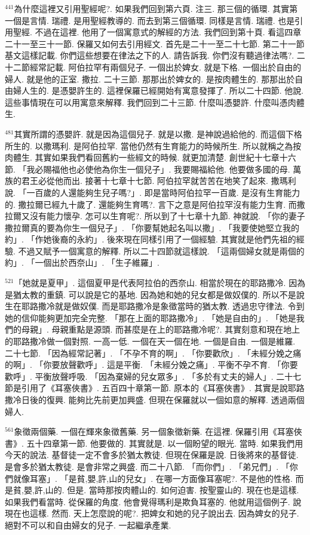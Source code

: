 \documentclass{book}
\begin{document}
$^{441}$為什麼這裡又引用聖經呢?.
如果我們回到第六頁.
注三.
那三個的循環.
其實第一個是言情.
瑞禮.
是用聖經教導的.
而去到第三個循環.
同樣是言情.
瑞禮.
也是引用聖經.
不過在這裡.
他用了一個寓意式的解經的方法.
我們回到第十頁.
看這四章二十一至三十一節.
保羅又如何去引用經文.
首先是二十一至二十七節.
第二十一節基文這樣記載.
你們這些想要在律法之下的人.
請告訴我.
你們沒有聽過律法嗎?.
二十二節經常記載.
阿伯拉罕有兩個兒子.
一個出於婢女.
就是下格.
一個出於自由的婦人.
就是他的正室.
撒拉.
二十三節.
那那出於婢女的.
是按肉體生的.
那那出於自由婦人生的.
是憑嬰許生的.
這裡保羅已經開始有寓意發揮了.
所以二十四節.
他說.
這些事情現在可以用寓意來解釋.
我們回到二十三節.
什麼叫憑嬰許.
什麼叫憑肉體生.

$^{481}$其實所謂的憑嬰許.
就是因為這個兒子.
就是以撒.
是神說過給他的.
而這個下格所生的.
以撒瑪利.
是阿伯拉罕.
當他仍然有生育能力的時候所生.
所以就稱之為按肉體生.
其實如果我們看回舊約一些經文的時候.
就更加清楚.
創世紀十七章十六節.
「我必賜福他也必使他為你生一個兒子」.
我要賜福給他.
他要做多國的母.
萬族的君王必從他而出.
接著十七章十七節.
阿伯拉罕就苦苦在地笑了起來.
撒瑪利說.
「一百歲的人還能夠生兒子嗎?」.
即是當時阿伯拉罕一百歲.
是沒有生育能力的.
撒拉爾已經九十歲了.
還能夠生育嗎?.
言下之意是阿伯拉罕沒有能力生育.
而撒拉爾又沒有能力懷孕.
怎可以生育呢?.
所以到了十七章十九節.
神就說.
「你的妻子撒拉爾真的要為你生一個兒子」.
「你要幫她起名叫以撒」.
「我要使她堅立我的約」.
「作她後裔的永約」.
後來現在同樣引用了一個經驗.
其實就是他們先祖的經驗.
不過又賦予一個寓意的解釋.
所以二十四節就這樣說.
「這兩個婦女就是兩個的約」.
「一個出於西奈山」.
「生子維羅」.

$^{521}$「她就是夏甲」.
這個夏甲是代表阿拉伯的西奈山.
相當於現在的耶路撒冷.
因為是猶太教的重鎮.
可以說是它的基地.
因為她和她的兒女都是做奴僕的.
所以不是說生在耶路撒冷就是做奴僕.
而是耶路撒冷是象徵當時的猶太教.
透過忠守律法.
令到她的信仰能夠更加完全完整.
「那在上面的耶路撒冷」.
「她是自由的」.
「她是我們的母親」.
母親重點是源頭.
而甚麼是在上的耶路撒冷呢?.
其實刻意和現在地上的耶路撒冷做一個對照.
一高一低.
一個在天一個在地.
一個是自由.
一個是維羅.
二十七節.
「因為經常記著」.
「不孕不育的啊」.
「你要歡欣」.
「未經分娩之痛的啊」.
「你要放聲歡呼」.
這是平衡.
「未經分娩之痛」.
平衡不孕不育.
「你要歡呼」.
平衡放聲呼吸.
「因為棄婦的兒女眾多」.
「多於有丈夫的婦人」.
二十七節是引用了《耳塞俠書》.
五百四十章第一節.
原本的《耳塞俠書》.
其實是說耶路撒冷日後的復興.
能夠比先前更加興盛.
但現在保羅就以一個如意的解釋.
透過兩個婦人.

$^{561}$象徵兩個藥.
一個在輝來象徵舊藥.
另一個象徵新藥.
在這裡.
保羅引用《耳塞俠書》.
五十四章第一節.
他要做的.
其實就是.
以一個盼望的眼光.
當時.
如果我們用今天的說法.
基督徒一定不會多於猶太教徒.
但現在保羅是說.
日後將來的基督徒.
是會多於猶太教徒.
是會非常之興盛.
而二十八節.
「而你們」.
「弟兄們」.
「你們就像耳塞」.
「是貧,嬰,許,山的兒女」.
在哪一方面像耳塞呢?.
不是他的性格.
而是貧,嬰,許,山的.
但是.
當時那按肉體山的.
如何迫害.
按聖靈山的.
現在也是這樣.
如果我們看當時.
從保羅的角度.
他會覺得瑪利是欺負耳塞的.
他就用這個例子.
說現在也這樣.
然而.
天上怎麼說的呢?.
把婢女和她的兒子說出去.
因為婢女的兒子.
絕對不可以和自由婦女的兒子.
一起繼承產業.
\end{document}
